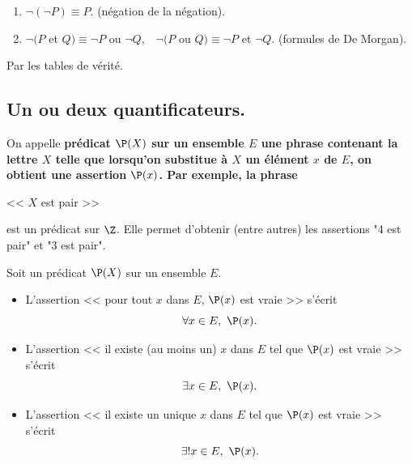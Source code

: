 \documentclass[11pt]{article}
\begin{document}
\begin{prop}{}{}
    \begin{enumerate}
        \item $\lnot(\lnot P)\equiv P$. (négation de la négation).
        \item $\lnot(P$ et $Q)\equiv\lnot P$ ou $\lnot Q$,$\quad$$\lnot(P$ ou $Q)\equiv\lnot P$ et $\lnot Q$. (formules de De Morgan).
    \end{enumerate}
    \tcblower
    Par les tables de vérité.
\end{prop}

\subsection{Un ou deux quantificateurs.}

On appelle \bf{prédicat} $\P(X)$ sur un ensemble $E$ une phrase contenant la lettre $X$ telle que lorsqu'on substitue à $X$ un élément $x$ de $E$, on obtient une assertion $\P(x)$. Par exemple, la phrase
\begin{center}
    << $X$ est pair >>
\end{center}
est un prédicat sur $\Z$. Elle permet d'obtenir (entre autres) les assertions "4 est pair" et "3 est pair".
\vspace{0.3cm}

\begin{defi}{}{}
    Soit un prédicat $\P(X)$ sur un ensemble $E$.
    \begin{itemize}
        \item L'assertion << pour tout $x$ dans $E$, $\P(x)$ est vraie >> s'écrit
        \begin{equation*}
            \forall x \in E, ~ \P(x).
        \end{equation*}
        \item L'assertion << il existe (au moins un) $x$ dans $E$ tel que $\P(x)$ est vraie >> s'écrit
        \begin{equation*}
            \exists x \in E, ~ \P(x).
        \end{equation*}
        \item L'assertion << il existe un unique $x$ dans $E$ tel que $\P(x)$ est vraie >> s'écrit
        \begin{equation*}
            \exists! x \in E, ~ \P(x).
        \end{equation*}
    \end{itemize}
\end{defi}
\end{document}

